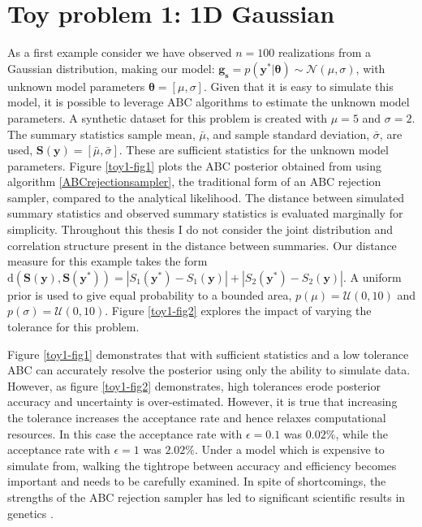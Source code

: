 \section{Toy problem 1: 1D Gaussian}
As a first example consider we have observed $n = 100$ realizations from a Gaussian distribution, making our model: $\bm{g_s} = p(\bm{y^*}|\bm{\theta}) \sim \mathcal{N}(\mu,\sigma)$, with unknown model parameters $\bm{\theta} = [\mu,\sigma]$. Given that it is easy to simulate this model, it is possible to leverage ABC algorithms to estimate the unknown model parameters. A synthetic dataset for this problem is created with $\mu = 5$ and $\sigma = 2$. The summary statistics sample mean, $\bar{\mu}$, and sample standard deviation, $\bar{\sigma}$, are used, $\bm{S}(\bm{y}) = [\bar{\mu},\bar{\sigma}]$. These are sufficient statistics for the unknown model parameters. Figure \ref{toy1-fig1} plots the ABC posterior obtained from using algorithm \ref{ABCrejectionsampler}, the traditional form of an ABC rejection sampler, compared to the analytical likelihood. The distance between simulated summary statistics and observed summary statistics is evaluated marginally for simplicity. Throughout this thesis I do not consider the joint distribution and correlation structure present in the distance between summaries. Our distance measure for this example takes the form $\text{d}(\bm{S}(\bm{y}),\bm{S}(\bm{y^*})) = |S_1(\bm{y^*}) - S_1(\bm{y})| +| S_2(\bm{y^*}) - S_2(\bm{y})|$. A uniform prior is used to give equal probability to a bounded area, $p(\mu) = \mathcal{U}(0,10)$ and $p(\sigma) = \mathcal{U}(0,10)$. Figure \ref{toy1-fig2} explores the impact of varying the tolerance for this problem.\par

Figure \ref{toy1-fig1} demonstrates that with sufficient statistics and a low tolerance ABC can accurately resolve the posterior using only the ability to simulate data. However, as figure \ref{toy1-fig2} demonstrates, high tolerances erode posterior accuracy and uncertainty is over-estimated. However, it is true that increasing the tolerance increases the acceptance rate and hence relaxes computational resources. In this case the acceptance rate with $\epsilon = 0.1$ was $0.02\%$, while the acceptance rate with $\epsilon = 1$ was $2.02\%$. Under a model which is expensive to simulate from, walking the tightrope between accuracy and efficiency becomes important and needs to be carefully examined. In spite of shortcomings, the strengths of the ABC rejection sampler has led to significant scientific results in genetics \citep{Fu1997,Weiss1998a,Pritchard1999a}.

